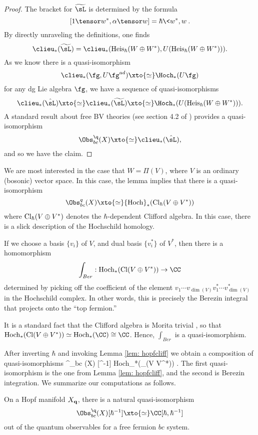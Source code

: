 \begin{proof}
The bracket for $\widetilde{\sL}$ is determined by the formula
\[
[1 \tensor w^* , \alpha \tensor w] = \hbar \<w^*, w\> .
\]
By directly unraveling the definitions, one finds
\[
\clieu_*(\widetilde{\sL}) = \clieu_*({\rm Heis}_\hbar(W \oplus W^*), U({\rm Heis}_\hbar(W \oplus W^*))).
\]
As we know there is a quasi-isomorphism
\[
\clieu_*(\fg, U\fg^{ad}) \xto{\simeq} \Hoch_*(U\fg)
\]
for any dg Lie algebra $\fg$,
we have a sequence of quasi-isomorphisms
\[
\clieu_*(\Hat{\sL}) \xto{\simeq} \clieu_*(\widetilde{\sL}) \xto{\simeq} \Hoch_*(U({\rm Heis}_\hbar(W \oplus W^*))).
\]
A standard result about free BV theories (see section 4.2 of \cite{CG1}) provides a quasi-isomorphism
\[
\Obs^{\q}_{bc} (X) \xto{\simeq} \clieu_*(\Hat{\sL}),
\] 
and so we have the claim.
\end{proof}

We are most interested in the case that $W = \Pi(V)$, where $V$ is an ordinary (bosonic) vector space. 
In this case, the lemma implies that there is a quasi-isomorphism
\[
\Obs^q_{bc}(X) \xto{\simeq} {\rm Hoch}_*(\Cl_\hbar(V \oplus V^*)) 
\]
where ${\rm Cl}_\hbar(V \oplus V^*)$ denotes the $\hbar$-dependent Clifford algebra. 
In this case, there is a slick description of the Hochschild homology. 

If we choose a basis $\{v_i\}$ of $V$, and dual basis $\{v_i^*\}$ of $V^*$, then there is a homomorphism 
\[
\int_{Ber} : {\rm Hoch}_* (\Cl (V \oplus V^*)) \to \CC 
\]
determined by picking off the coefficient of the element $v_1 \cdots v_{\dim(V)} v_1^* \cdots v^*_{\dim(V)}$ in the Hochschild complex. 
In other words, this is precisely the Berezin integral that projects onto the ``top fermion.'' 

It is a standard fact that the Clifford algebra is Morita trivial \cite{KasselCliff}, so that ${\rm Hoch}_*(\Cl(V \oplus V^*)) \simeq {\rm Hoch}_* (\CC) \cong \CC$.
Hence, $\int_{Ber}$ is a quasi-isomorphism. 

After inverting $\hbar$ and invoking Lemma \ref{lem: hopfcliff} we obtain a composition of quasi-isomorphisms 
\beqn\label{hopfcliffquasi}
\Obs^\q_{bc} (X) [\hbar^{-1}] \xto{\simeq} {\rm Hoch}_*(\Cl_\hbar (V \oplus V^*)) \xto{\simeq} .
\eeqn
The first quasi-isomorphism is the one from Lemma \ref{lem: hopfcliff}, and the second is Berezin integration. 
We summarize our computations as follows.

\begin{lem}
On a Hopf manifold $X_{\bf q}$, there is a natural quasi-isomorphism
\[
\Obs^\q_{bc} (X) [\hbar^{-1}] \xto{\simeq} \CC[\hbar,\hbar^{-1}]
\]
out of the quantum observables for a free fermion $bc$ system.
\end{lem}

